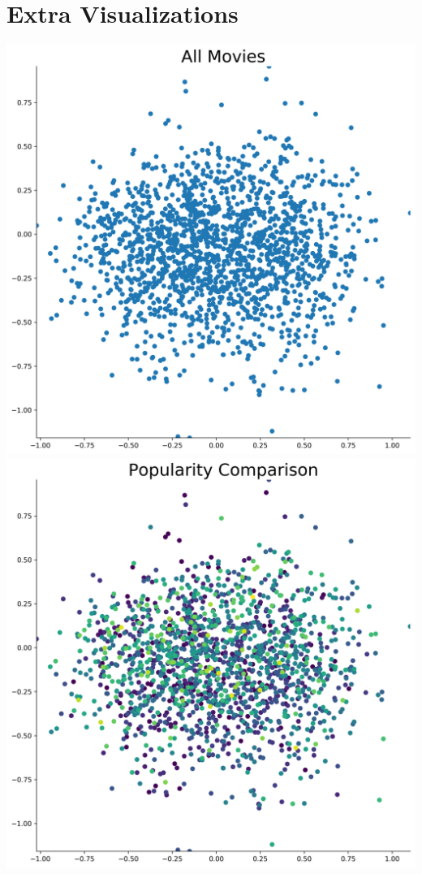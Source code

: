 \section*{Extra Visualizations}

\includegraphics[scale=0.35]{"All Movies"}
\includegraphics[scale=0.35]{"Popularity Comparison"} \\ \\
